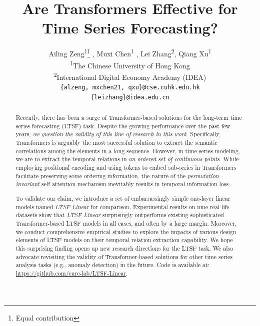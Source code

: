 \documentclass[10pt,twocolumn,letterpaper]{article}
\begin{document}
\title{Are Transformers Effective for Time Series Forecasting?}

\newcommand*{\affaddr}[1]{#1} %
\newcommand*{\affmark}[1][*]{\textsuperscript{#1}}
\newcommand*{\email}[1]{\texttt{#1}}

\makeatletter
\newcommand{\printfnsymbol}[1]{%
  \textsuperscript{\@fnsymbol{#1}}%
}
\makeatother

\author{%
Ailing Zeng\affmark[1]\thanks{Equal contribution} , Muxi Chen\affmark[1]\printfnsymbol{1}, Lei Zhang\affmark[2], Qiang Xu\affmark[1]\\
\affaddr{\affmark[1]The Chinese University of Hong Kong}\\
\affaddr{\affmark[2]International Digital Economy Academy (IDEA)}\\
\email{\tt\small\{alzeng, mxchen21, qxu\}@cse.cuhk.edu.hk}\\
\email{\tt\small\{leizhang\}@idea.edu.cn}
}





\maketitle

\begin{abstract}
Recently, there has been a surge of Transformer-based solutions for the long-term time series forecasting (LTSF) task. Despite the growing performance over the past few years, \emph{we question the validity of this line of research in this work}.
Specifically, Transformers is arguably the most successful solution to extract the semantic correlations among the elements in a long sequence. However, in time series modeling, we are to extract the temporal relations in \emph{an ordered set of continuous points}. While employing positional encoding and using tokens to embed sub-series in Transformers facilitate preserving some ordering information, the nature of the \emph{permutation-invariant} self-attention mechanism inevitably results in temporal information loss. 

To validate our claim, we introduce a set of embarrassingly simple one-layer linear models named \emph{LTSF-Linear} for comparison. Experimental results on nine real-life datasets show that \emph{LTSF-Linear} surprisingly outperforms existing sophisticated Transformer-based LTSF models in all cases, and often by a large margin. Moreover, we conduct comprehensive empirical studies to explore the impacts of various design elements of LTSF models on their temporal relation extraction capability.
We hope this surprising finding opens up new research directions for the LTSF task. We also advocate revisiting the validity of Transformer-based solutions for other time series analysis tasks (e.g., anomaly detection) in the future. Code is available at: \url{https://github.com/cure-lab/LTSF-Linear}.

\end{abstract}








\pagebreak





\end{document}
